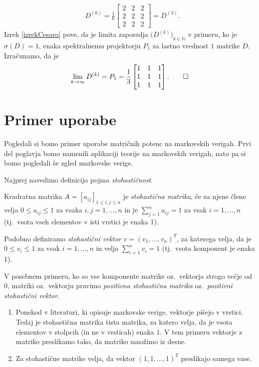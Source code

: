 \documentclass[mat1]{fmfdelo}
\newcommand{\N}{\mathbb N}
\begin{document}
\begin{zgled}
\begin{align*}
        &D^{(6)} = \frac{1}{6}
        \begin{bmatrix}
            2 & 2 & 2 \\
            2 & 2 & 2 \\
            2 & 2 & 2
        \end{bmatrix} = D^{(3)}.
    \end{align*}
    Izrek \ref{izrekCesaro} pove, da je limita zaporedja $\big(D^{(k)}\big)_{k\in\N}$ v primeru, ko je $\sigma (D) = 1$, enaka spektralnemu projektorju $P_1$ za lastno vrednost $1$ matrike $D$. Izračunamo, da je
    \begin{equation*}
        \lim_{k\rightarrow\infty} D^{(k)} = P_1 =
        \frac{1}{3}
        \begin{bmatrix}
            1 & 1 & 1 \\
            1 & 1 & 1 \\
            1 & 1 & 1
        \end{bmatrix}. \qedhere
    \end{equation*}
\end{zgled}

\section{Primer uporabe}
Pogledali si bomo primer uporabe matričnih potenc na markovskih verigah. Prvi del poglavja bomo namenili aplikaciji teorije na markovskih verigah, nato pa si bomo pogledali še zgled markovske verige.

Najprej navedimo definicijo pojma \emph{stohastičnost}.
\begin{definicija}
    Kvadratna matrika $A = [a_{ij}]_{1 \leq i,j \leq n}$ je \emph{stohastična matrika}, če za njene člene velja $0 \leq a_{ij} \leq 1$ za vsaka $i,j = 1,\ldots, n$ in je $\sum_{j=1}^n a_{ij} = 1$ za vsak $i = 1,\dots,n$ (tj.\ vsota vseh elementov v isti vrstici je enaka 1).

    Podobno definiramo \emph{stohastični vektor} $v = (v_1, \dots, v_n)^T$, za katerega velja, da je $0 \leq v_i \leq 1$ za vsak $i = 1,\ldots, n$ in velja $\sum_{i=1}^n v_i = 1$ (tj.\ vsota komponent je enaka 1).

    V posebnem primeru, ko so vse komponente matrike oz.\ vektorja strogo večje od 0, matriki oz.\ vektorju pravimo \emph{pozitivna stohastična matrika} oz.\ \emph{pozitivni stohastični vektor}.
\end{definicija}

\begin{opomba}
    \leavevmode
    \begin{enumerate}
        \item Ponekod v literaturi, ki opisuje markovske verige, vektorje pišejo v vrstici. Tedaj je stohastična matrika tista matrika, za katero velja, da je vsota elementov v stolpcih (in ne v vrsticah) enaka $1$. V tem primeru vektorje z matriko preslikamo tako, da matriko množimo iz desne.
        \item Za stohastične matrike velja, da vektor $(1, 1, \ldots, 1)^T$ preslikajo samega vase.
    \end{enumerate}
\end{opomba}
\end{document}
